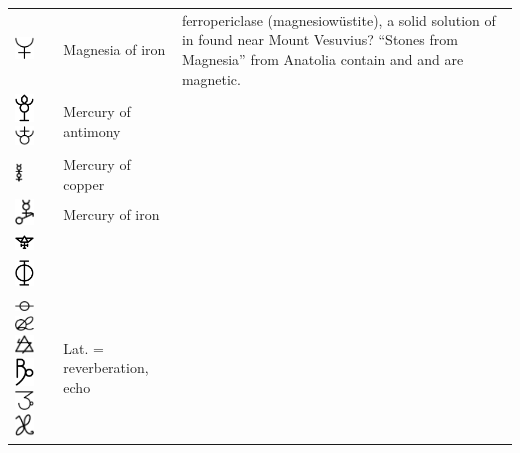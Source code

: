 \documentclass[british,final,landscape]{scrartcl}
\begin{document}
\begin{refsection}
\begin{supertabular}{p{0.3\textwidth}p{0.34\textwidth}p{0.34\textwidth}}
   \includegraphics[width=5mm]{Unknown/MagnesiaOfIron} & Magnesia of iron &  ferropericlase (magnesiowüstite), a solid solution of  in  found near Mount Vesuvius? ``Stones from Magnesia'' from  Anatolia contain  and  and are magnetic. \\
   \includegraphics[width=5mm]{Unknown/MercuryOfAntimony} \includegraphics[width=5mm]{Unknown/MercuryOfAntimony2} & Mercury of antimony & \\
   \includegraphics[height=5mm]{Unknown/MercuryOfCopper} & Mercury of copper & \\
   \includegraphics[width=5mm]{Unknown/MercuryOfIron} & Mercury of iron & \\
   \includegraphics[width=5mm]{Unknown/MetalumSulphuratum} &  & \\
   \includegraphics[width=5mm]{Unknown/RenovatioMetallorum} &  & \\
   \includegraphics[width=5mm]{Unknown/Reverberatio} \includegraphics[width=5mm]{Unknown/Reverberatio2} \includegraphics[width=5mm]{Unknown/Reverberatio3} \includegraphics[width=5mm]{Unknown/Reverberatio4} \includegraphics[width=5mm]{Unknown/Reverberatio5} \includegraphics[width=5mm]{Unknown/Reverberatio6} & Lat.  = reverberation, echo & \\

\end{supertabular}
\end{refsection}
\end{document}
